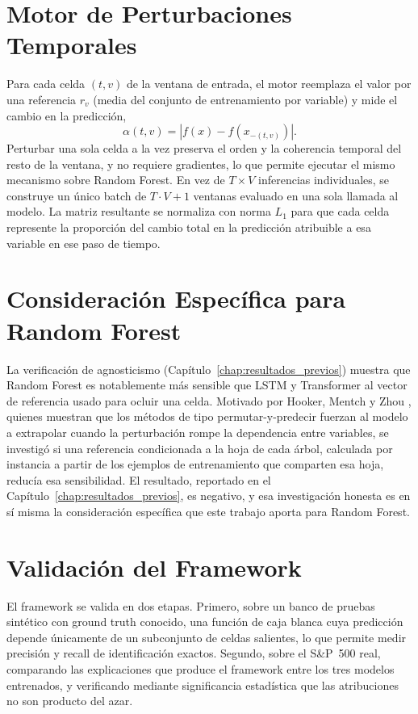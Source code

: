 \section{Motor de Perturbaciones Temporales}

Para cada celda $(t,v)$ de la ventana de entrada, el motor reemplaza el valor por una referencia $r_v$ (media del conjunto de entrenamiento por variable) y mide el cambio en la predicción,
\begin{equation}
    \alpha(t,v) = \left| f(x) - f(x_{-(t,v)}) \right|.
\end{equation}
Perturbar una sola celda a la vez preserva el orden y la coherencia temporal del resto de la ventana, y no requiere gradientes, lo que permite ejecutar el mismo mecanismo sobre Random Forest. En vez de $T \times V$ inferencias individuales, se construye un único batch de $T{\cdot}V{+}1$ ventanas evaluado en una sola llamada al modelo. La matriz resultante se normaliza con norma $L_1$ para que cada celda represente la proporción del cambio total en la predicción atribuible a esa variable en ese paso de tiempo.

\section{Consideración Específica para Random Forest}

La verificación de agnosticismo (Capítulo~\ref{chap:resultados_previos}) muestra que Random Forest es notablemente más sensible que LSTM y Transformer al vector de referencia usado para ocluir una celda. Motivado por Hooker, Mentch y Zhou \cite{hooker2021}, quienes muestran que los métodos de tipo permutar-y-predecir fuerzan al modelo a extrapolar cuando la perturbación rompe la dependencia entre variables, se investigó si una referencia condicionada a la hoja de cada árbol, calculada por instancia a partir de los ejemplos de entrenamiento que comparten esa hoja, reducía esa sensibilidad. El resultado, reportado en el Capítulo~\ref{chap:resultados_previos}, es negativo, y esa investigación honesta es en sí misma la consideración específica que este trabajo aporta para Random Forest.

\section{Validación del Framework}

El framework se valida en dos etapas. Primero, sobre un banco de pruebas sintético con ground truth conocido, una función de caja blanca cuya predicción depende únicamente de un subconjunto de celdas salientes, lo que permite medir precisión y recall de identificación exactos. Segundo, sobre el S\&P~500 real, comparando las explicaciones que produce el framework entre los tres modelos entrenados, y verificando mediante significancia estadística que las atribuciones no son producto del azar.



